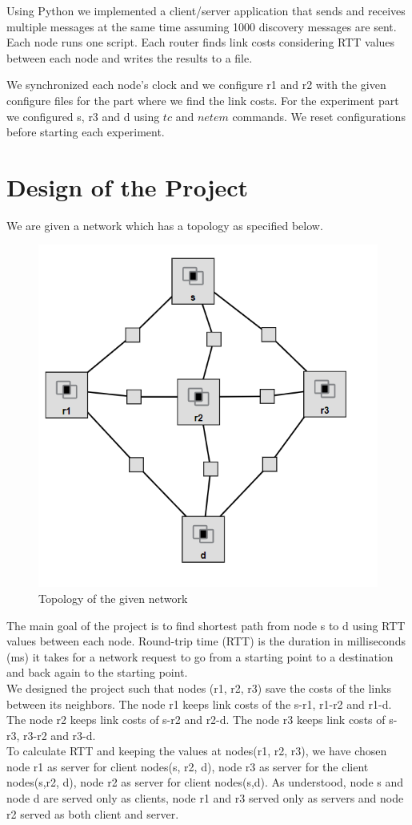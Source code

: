 \documentclass[conference]{IEEEtran}
\begin{document}
Using Python we implemented a client/server application that sends and receives multiple messages at the same time assuming 1000 discovery messages are sent. Each node runs one script. Each router finds link costs considering RTT values between each node and writes the results to a file.

We synchronized each node's clock and we configure r1 and r2 with the given configure files for the part where we find the link costs. For the experiment part we configured s, r3 and d using $tc$ and $netem$ commands. We reset configurations before starting each experiment.
\newpage
\section{Design of the Project}
We are given a network which has a topology as specified below.
\begin{figure}[h!]
\includegraphics[scale = 1]{tp.png}
\caption{Topology of the given network}
\end{figure}
The main goal of the project is to find shortest path from node s to d using RTT values between each node. Round-trip time (RTT) is the duration in milliseconds (ms) it takes for a network request to go from a starting point to a destination and back again to the starting point. \\
We designed the project such that nodes (r1, r2, r3) save the costs of the links between its neighbors. The node r1 keeps link costs of the s-r1, r1-r2 and r1-d. The node r2 keeps link costs of s-r2 and r2-d. The node r3 keeps link costs of s-r3, r3-r2 and r3-d. \\
To calculate RTT and keeping the values at nodes(r1, r2, r3), we have chosen node r1 as server for client nodes(s, r2, d), node r3 as server for the client nodes(s,r2, d), node r2 as server for client nodes(s,d). As understood, node s and node d are served only as clients, node r1 and r3 served only as servers and node r2 served as both client and server.
\end{document}
